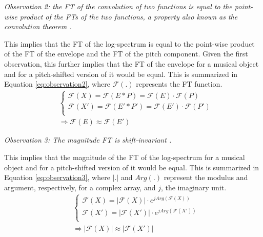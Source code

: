 \documentclass[journal]{IEEEtran}
\begin{document}
\emph{Observation 2: the FT of the convolution of two functions is equal to the point-wise product of the FTs of the two functions, a property also known as the convolution theorem \cite{proakis1995}.}

This implies that the FT of the log-spectrum is equal to the point-wise product of the FT of the envelope and the FT of the pitch component. Given the first observation, this further implies that the FT of the envelope for a musical object and for a pitch-shifted version of it would be equal. This is summarized in Equation \ref{eq:observation2}, where $\mathcal{F}(.)$ represents the FT function.
\begin{equation}
\label{eq:observation2}
\begin{split}
& \begin{cases}
\mathcal{F}(X) = \mathcal{F}(E * P) = \mathcal{F}(E) \cdot \mathcal{F}(P) \\
\mathcal{F}(X') = \mathcal{F}(E' * P') = \mathcal{F}(E') \cdot \mathcal{F}(P') \\
\end{cases} \\
& \Rightarrow \mathcal{F}(E) \approx \mathcal{F}(E')
\end{split}
\end{equation}

\emph{Observation 3: The magnitude FT is shift-invariant \cite{proakis1995}.}

This implies that the magnitude of the FT of the log-spectrum for a musical object and for a pitch-shifted version of it would be equal. This is summarized in Equation \ref{eq:observation3}, where $|.|$ and $Arg(.)$ represent the modulus and argument, respectively, for a complex array, and $j$, the imaginary unit.
\begin{equation}
\label{eq:observation3}
\begin{split}
& \begin{cases}
\mathcal{F}(X) = |\mathcal{F}(X)| \cdot e^{j Arg(\mathcal{F}(X))} \\
\mathcal{F}(X') = |\mathcal{F}(X')| \cdot e^{j Arg(\mathcal{F}(X'))} \\
\end{cases} \\
& \Rightarrow |\mathcal{F}(X)| \approx |\mathcal{F}(X')|
\end{split}
\end{equation}
\end{document}
